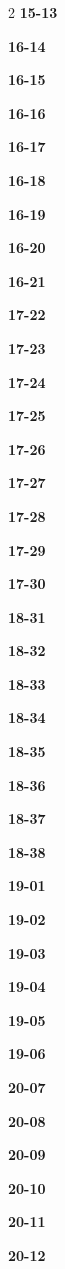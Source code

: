 \documentclass[10pt,a4paper]{article}
\begin{document}
\begin{multicols}{2}
\noindent\textbf{15-13}\ \par
\noindent\textbf{16-14}\ \par
\noindent\textbf{16-15}\ \par
\noindent\textbf{16-16}\ \par
\noindent\textbf{16-17}\ \par
\noindent\textbf{16-18}\ \par
\noindent\textbf{16-19}\ \par
\noindent\textbf{16-20}\ \par
\noindent\textbf{16-21}\ \par
\noindent\textbf{17-22}\ \par
\noindent\textbf{17-23}\ \par
\noindent\textbf{17-24}\ \par
\noindent\textbf{17-25}\ \par
\noindent\textbf{17-26}\ \par
\noindent\textbf{17-27}\ \par
\noindent\textbf{17-28}\ \par
\noindent\textbf{17-29}\ \par
\noindent\textbf{17-30}\ \par
\noindent\textbf{18-31}\ \par
\noindent\textbf{18-32}\ \par
\noindent\textbf{18-33}\ \par
\noindent\textbf{18-34}\ \par
\noindent\textbf{18-35}\ \par
\noindent\textbf{18-36}\ \par
\noindent\textbf{18-37}\ \par
\noindent\textbf{18-38}\ \par
\noindent\textbf{19-01}\ \par
\noindent\textbf{19-02}\ \par
\noindent\textbf{19-03}\ \par
\noindent\textbf{19-04}\ \par
\noindent\textbf{19-05}\ \par
\noindent\textbf{19-06}\ \par
\noindent\textbf{20-07}\ \par
\noindent\textbf{20-08}\ \par
\noindent\textbf{20-09}\ \par
\noindent\textbf{20-10}\ \par
\noindent\textbf{20-11}\ \par
\noindent\textbf{20-12}\ \par

\end{multicols}
\end{document}
